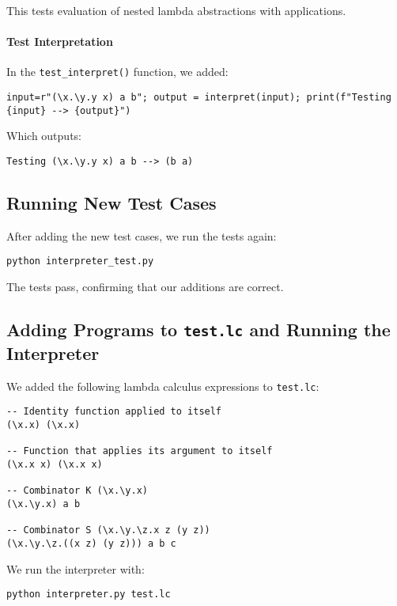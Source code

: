 This tests evaluation of nested lambda abstractions with applications.

\paragraph{Test Interpretation}

In the \texttt{test\_interpret()} function, we added:

\begin{verbatim}
input=r"(\x.\y.y x) a b"; output = interpret(input); print(f"Testing {input} --> {output}")
\end{verbatim}

Which outputs:

\begin{verbatim}
Testing (\x.\y.y x) a b --> (b a)
\end{verbatim}

\subsection{Running New Test Cases}

After adding the new test cases, we run the tests again:

\begin{verbatim}
python interpreter_test.py
\end{verbatim}

The tests pass, confirming that our additions are correct.

\subsection{Adding Programs to \texttt{test.lc} and Running the Interpreter}

\label{sec:testlc}

We added the following lambda calculus expressions to \texttt{test.lc}:

\begin{verbatim}
-- Identity function applied to itself
(\x.x) (\x.x)

-- Function that applies its argument to itself
(\x.x x) (\x.x x)

-- Combinator K (\x.\y.x)
(\x.\y.x) a b

-- Combinator S (\x.\y.\z.x z (y z))
(\x.\y.\z.((x z) (y z))) a b c
\end{verbatim}

We run the interpreter with:

\begin{verbatim}
python interpreter.py test.lc
\end{verbatim}

